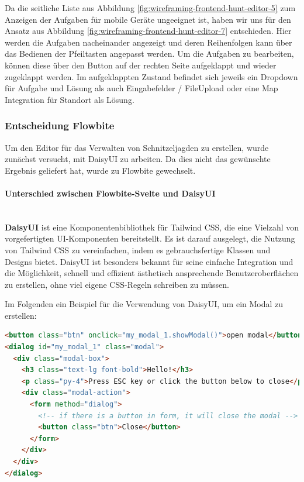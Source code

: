 Da die seitliche Liste aus Abbildung \ref{fig:wireframing-frontend-hunt-editor-5} zum Anzeigen der Aufgaben für mobile Geräte ungeeignet ist, haben wir uns für den Ansatz aus Abbildung \ref{fig:wireframing-frontend-hunt-editor-7} entschieden. Hier werden die Aufgaben nacheinander angezeigt und deren Reihenfolgen kann über das Bedienen der Pfeiltasten angepasst werden. Um die Aufgaben zu bearbeiten, können diese über den Button auf der rechten Seite aufgeklappt und wieder zugeklappt werden. Im aufgeklappten Zustand befindet sich jeweils ein Dropdown für Aufgabe und Lösung als auch Eingabefelder / FileUpload oder eine Map Integration für Standort als Lösung. 

\subsubsection{Entscheidung Flowbite}
Um den Editor für das Verwalten von Schnitzeljagden zu erstellen, wurde zunächst versucht, mit DaisyUI zu arbeiten. Da dies nicht das gewünschte Ergebnis geliefert hat, wurde zu Flowbite gewechselt.

\paragraph{Unterschied zwischen Flowbite-Svelte und DaisyUI} \mbox{}\\
\textbf{DaisyUI} ist eine Komponentenbibliothek für Tailwind CSS, die eine Vielzahl von vorgefertigten UI-Komponenten bereitstellt. Es ist darauf ausgelegt, die Nutzung von Tailwind CSS zu vereinfachen, indem es gebrauchsfertige Klassen und Designs bietet. DaisyUI ist besonders bekannt für seine einfache Integration und die Möglichkeit, schnell und effizient ästhetisch ansprechende Benutzeroberflächen zu erstellen, ohne viel eigene CSS-Regeln schreiben zu müssen. 

Im Folgenden ein Beispiel für die Verwendung von DaisyUI, um ein Modal zu erstellen:

\begin{lstlisting}[language=html, caption={DaisyUI Beispiel}]
<button class="btn" onclick="my_modal_1.showModal()">open modal</button>
<dialog id="my_modal_1" class="modal">
  <div class="modal-box">
    <h3 class="text-lg font-bold">Hello!</h3>
    <p class="py-4">Press ESC key or click the button below to close</p>
    <div class="modal-action">
      <form method="dialog">
        <!-- if there is a button in form, it will close the modal -->
        <button class="btn">Close</button>
      </form>
    </div>
  </div>
</dialog>
\end{lstlisting}

